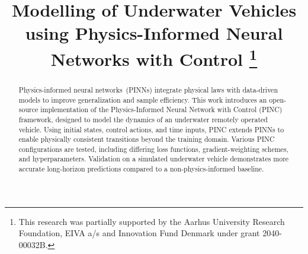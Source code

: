 \documentclass[conference]{IEEEtran}
\begin{document}
\title{Modelling of Underwater Vehicles using Physics-Informed Neural Networks with Control
\thanks{This research was partially supported by the Aarhus University Research Foundation, EIVA a/s and Innovation Fund Denmark under grant 2040-00032B.}
}

\author{%
\and
{}
\and
{}
\and
{}
}


\maketitle

\begin{abstract}

Physics-informed neural networks~(PINNs) integrate physical laws with data-driven models to improve generalization and sample efficiency. This work introduces an open-source implementation of the Physics-Informed Neural Network with Control (PINC) framework, designed to model the dynamics of an underwater remotely operated vehicle. Using initial states, control actions, and time inputs, PINC extends PINNs to enable physically consistent transitions beyond the training domain. Various PINC configurations are tested, including differing loss functions, gradient-weighting schemes, and hyperparameters. Validation on a simulated underwater vehicle demonstrates more accurate long-horizon predictions compared to a non-physics-informed baseline. 

\end{abstract}
\end{document}
